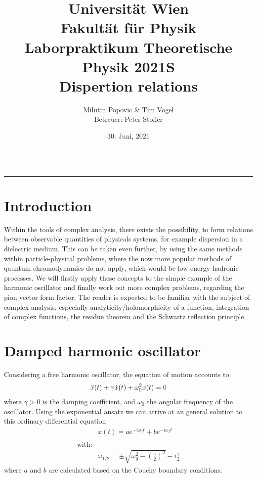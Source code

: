\documentclass[a4paper]{article}
\title{Universität Wien\\ Fakultät für Physik\\
\vspace{1.25cm}Laborpraktikum Theoretische Physik 2021S \\ Dispertion relations
}
\author{Milutin Popovic \& Tim Vogel \vspace{1cm}\\ Betreuer: Peter Stoffer}
\date{30. Juni, 2021}
\begin{document}
\maketitle
\noindent\rule[0.5ex]{\linewidth}{1pt}
\begin{abstract}
\end{abstract}
\noindent\rule[0.5ex]{\linewidth}{1pt}
\newcommand{\PV}{\mathop{\mathrlap{\pushR}}\!\int}
\newcommand{\pushR}{\mathchoice
  {\mkern2.5mu P}
  {\scriptstyle P}
  {\scriptscriptstyle P}
  {\scriptscriptstyle P}
}

\tableofcontents

\section{Introduction}
Within the tools of complex analysis, there exists the possibility, to form
relations between observable quantities of physicals systems, for example
dispersion in a dielectric medium. This can be taken even further, by using the
same methods within particle-physical problems, where the now more popular
methods of qauntum chromodynamics do not apply, which would be low energy
hadronic processes. We will firstly apply these concepts to the simple example
of the harmonic oscillator and finally work out more complex problems,
regarding the pion vector form factor. The reader is expected to be familiar
with the subject of complex analysis, especially analyticity/holomorphicity of
a function, integration of complex functions, the residue theorem and the
Schwartz reflection principle.










\section{Damped harmonic oscillator}
Considering a free harmonic oscillator, the equation of motion accounts to:
\begin{equation}
    \Ddot{x}(t)+\gamma\Dot{x}(t)+\omega_0^2x(t)=0
\end{equation}
where $\gamma > 0$ is the damping coefficient, and $\omega_0$ the angular frequency
of the oscillator. Using the exponential ansatz we can arrive at an general
solution to this ordinary differential equation
\begin{align}
    &x(t) = a e^{-i\omega_1 t} + b e^{-i\omega_2 t} \\
    &\nonumber \\
    \text{with:} \nonumber\\
    &\omega_{1/2} = \pm \sqrt{\omega_0^2 - (\frac{\gamma}{2})^2} -
    i\frac{\gamma}{2}
\end{align}
where $a$ and $b$ are calculated based on the Couchy boundary conditions.
\end{document}
